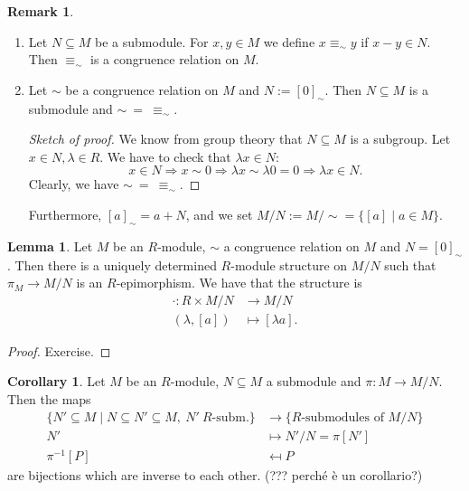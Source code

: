 \documentclass[12pt,a4paper]{report}
\theoremstyle{definition}
\newtheorem{corollary}[theorem]{Corollary} %
\newtheorem{lemma}[theorem]{Lemma}
\newtheorem*{remark}{Remark}
\theoremstyle{num.custom-title}
\DeclareMathOperator{\imp}{\Rightarrow}
\DeclareMathOperator{\sse}{\subseteq}
\begin{document}
\begin{remark}\ 
\begin{enumerate}
\item Let $N \sse M$ be a submodule. For $x,y \in M$ we define $x \equiv_\sim y$ if $x-y \in N$. Then $\equiv_\sim$ is a congruence relation on $M$.
\item Let $\sim$ be a congruence relation on $M$ and $N:=[0]_\sim$. Then $N \sse M$ is a submodule and $\sim \ = \ \equiv_\sim$.
\begin{proof}[Sketch of proof]
We know from group theory that $N \sse M$ is a subgroup. Let $x \in N, \lambda \in R$. We have to check that $\lambda x \in N$:
\[
x \in N \imp x \sim 0 \imp \lambda x \sim \lambda 0 = 0 \imp \lambda x \in N.
\]
Clearly, we have $\sim \ = \ \equiv_\sim$. 
\end{proof}
Furthermore, $[a]_\sim = a+N$, and we set $M/N := M/{\sim} = \{[a] \mid a \in M\}$.
\end{enumerate}
\end{remark}

\begin{lemma}\label{quotient_mod_str}
Let $M$ be an $R$-module, $\sim$ a congruence relation on $M$ and $N=[0]_\sim$. Then there is a uniquely determined $R$-module structure on $M/N$ such that $\pi_ M \to M/N$ is an $R$-epimorphism. We have that the structure is
\begin{align*}
\cdot \colon R \times M/N &\to M/N \\
(\lambda,[a]) &\mapsto [\lambda a].
\end{align*}
\begin{proof}
Exercise.
\end{proof}
\end{lemma}

\begin{corollary}
Let $M$ be an $R$-module, $N \sse M$ a submodule and $\pi : M \to M/N$. Then the maps
\begin{align*}
\{N' \sse M \mid N \sse N' \sse M, \ N' \ R\text{-subm.}\} &\to \{R\text{-submodules of } M/N\} \\
N' & \mapsto N'/N = \pi[N'] \\
\pi^{-1}[P] &\mapsfrom P
\end{align*}
are bijections which are inverse to each other. (??? perché è un corollario?)
\end{corollary}
\end{document}
